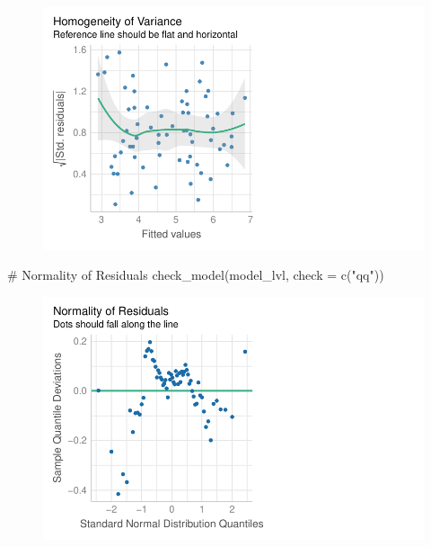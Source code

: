 \documentclass[
  letterpaper,
  DIV=11,
  numbers=noendperiod]{scrartcl}
\newenvironment{Shaded}{\begin{snugshade}}{\end{snugshade}}
\newcommand{\AttributeTok}[1]{\textcolor[rgb]{0.40,0.45,0.13}{#1}}
\newcommand{\CommentTok}[1]{\textcolor[rgb]{0.37,0.37,0.37}{#1}}
\newcommand{\FunctionTok}[1]{\textcolor[rgb]{0.28,0.35,0.67}{#1}}
\newcommand{\NormalTok}[1]{\textcolor[rgb]{0.00,0.23,0.31}{#1}}
\newcommand{\StringTok}[1]{\textcolor[rgb]{0.13,0.47,0.30}{#1}}
\begin{document}
\begin{figure}[H]

{\centering \includegraphics{sds-291_s-24_case-study-template_files/figure-pdf/unnamed-chunk-12-4.pdf}

}

\end{figure}

\begin{Shaded}
\begin{Highlighting}[]
\CommentTok{\# Normality of Residuals}
\FunctionTok{check\_model}\NormalTok{(model\_lvl, }\AttributeTok{check =} \FunctionTok{c}\NormalTok{(}\StringTok{"qq"}\NormalTok{))}
\end{Highlighting}
\end{Shaded}

\begin{figure}[H]

{\centering \includegraphics{sds-291_s-24_case-study-template_files/figure-pdf/unnamed-chunk-12-5.pdf}

}

\end{figure}
\end{document}
